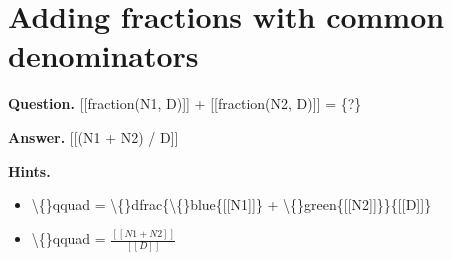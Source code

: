 \documentclass{article}
\begin{document}
\section*{Adding fractions with common denominators}
\textbf{Question.} [[fraction(N1, D)]] + [[fraction(N2, D)]] = \{?\}

\textbf{Answer.} [[(N1 + N2) / D]]

\textbf{Hints.}
\begin{itemize}
  \item \textbackslash\{\}qquad = \textbackslash\{\}dfrac\{\textbackslash\{\}blue\{[[N1]]\} + \textbackslash\{\}green\{[[N2]]\}\}\{[[D]]\}
  \item \textbackslash\{\}qquad = $\frac{[[N1 + N2]]}{[[D]]}$
\end{itemize}
\end{document}
